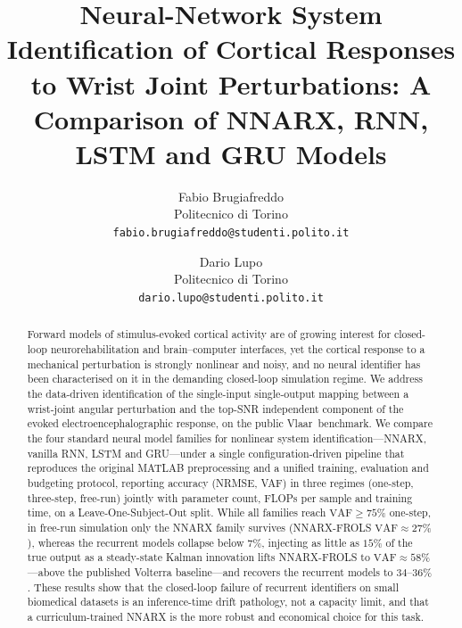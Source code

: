 \documentclass[10pt,twocolumn,letterpaper]{article}
\begin{document}
\title{Neural-Network System Identification of Cortical Responses to
       Wrist Joint Perturbations: A Comparison of NNARX, RNN, LSTM and
       GRU Models}

\author{Fabio Brugiafreddo\\
Politecnico di Torino\\
{\tt\small fabio.brugiafreddo@studenti.polito.it}
\and
Dario Lupo\\
Politecnico di Torino\\
{\tt\small dario.lupo@studenti.polito.it}
}
\maketitle

\begin{abstract}
   Forward models of stimulus-evoked cortical activity are of growing
   interest for closed-loop neurorehabilitation and brain--computer
   interfaces, yet the cortical response to a mechanical perturbation is
   strongly nonlinear and noisy, and no neural identifier has been
   characterised on it in the demanding closed-loop simulation regime.
   We address the data-driven identification of the single-input
   single-output mapping between a wrist-joint angular perturbation and
   the top-SNR independent component of the evoked
   electroencephalographic response, on the public Vlaar~\etal benchmark.
   We compare the four standard neural model families for nonlinear
   system identification---NNARX, vanilla RNN, LSTM and GRU---under a
   single configuration-driven pipeline that reproduces the original
   MATLAB preprocessing and a unified training, evaluation and budgeting
   protocol, reporting accuracy (NRMSE, VAF) in three regimes (one-step,
   three-step, free-run) jointly with parameter count, FLOPs per sample
   and training time, on a Leave-One-Subject-Out split. While all
   families reach $\mathrm{VAF}\geq 75\%$ one-step, in free-run
   simulation only the NNARX family survives (NNARX-FROLS
   $\mathrm{VAF}\approx 27\%$), whereas the recurrent models collapse
   below $7\%$, injecting as little as $15\%$ of the true output as a
   steady-state Kalman innovation lifts NNARX-FROLS to
   $\mathrm{VAF}\approx 58\%$---above the published Volterra
   baseline---and recovers the recurrent models to $34$--$36\%$. These
   results show that the closed-loop failure of recurrent identifiers on
   small biomedical datasets is an inference-time drift pathology, not a
   capacity limit, and that a curriculum-trained NNARX is the more robust
   and economical choice for this task.
\end{abstract}
\end{document}
